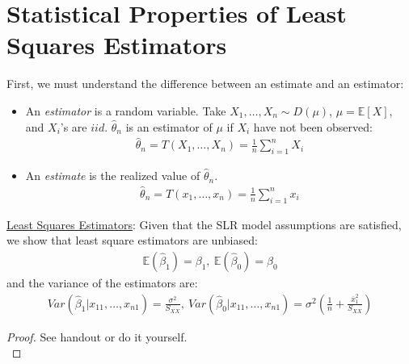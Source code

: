 \documentclass{article}
\newcommand{\E}{\mathbb{E}}
\newcommand{\xbar}{\overline{x}}
\newcommand{\sumiton}{\sum_{i=1}^n}
\begin{document}
\section{Statistical Properties of Least Squares Estimators}
First, we must understand the difference between an estimate and an estimator:
\begin{itemize}
    \item An \textit{estimator} is a random variable. Take $X_1, \ldots, X_n \sim D(\mu)$, $\mu = \E[X]$, and $X_i$'s are $iid$. $\hat{\theta}_n$ is an estimator of $\mu$ if $X_i$ have not been observed:
    \begin{align}
        \hat{\theta}_n = T(X_1,\ldots,X_n) = \frac{1}{n}\sumiton X_i
    \end{align}
    \item An \textit{estimate} is the realized value of $\hat{\theta}_n$.
    \begin{align}
        \hat{\theta}_n = T(x_1,\ldots, x_n) = \frac{1}{n} \sumiton x_i
    \end{align}
\end{itemize}
\underline{Least Squares Estimators}: Given that the SLR model assumptions are satisfied, we show that least square estimators are unbiased:
\begin{align}
    \E(\hat{\beta}_1) = \beta_1,\ \E(\hat{\beta}_0) = \beta_0
\end{align}
and the variance of the estimators are: 
\begin{align}
    Var(\hat{\beta}_1 | x_{11}, \ldots, x_{n1}) = \frac{\sigma^2}{S_{XX}},\ Var(\hat{\beta}_0 | x_{11}, \ldots, x_{n1}) = \sigma^2\left(\frac{1}{n} + \frac{\xbar_1^2}{S_{XX}}\right)
\end{align}
\begin{proof}
See handout or do it yourself.\\
\end{proof}
\end{document}
